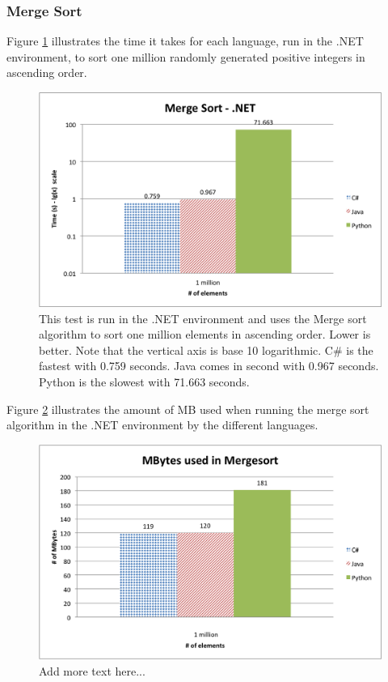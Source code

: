 \subsubsection{Merge Sort}

Figure \ref{fig:net_merge_sort} illustrates the time it takes for each language, run in the .NET environment, to sort one million randomly generated positive integers in ascending order.

\begin{figure}[h]
	\centering
	\includegraphics[width=1.0\linewidth]{chapters/new_media/MergeSortNet.png}
	\caption{This test is run in the .NET environment and uses the Merge sort algorithm to sort one million elements in ascending order. Lower is better. Note that the vertical axis is base 10 logarithmic. C\# is the fastest with 0.759 seconds. Java comes in second with 0.967 seconds. Python is the slowest with 71.663 seconds.}
	\label{fig:net_merge_sort}
\end{figure}

Figure \ref{fig:net_merge_sort_memory} illustrates the amount of MB used when running the merge sort algorithm in the .NET environment by the different languages.

\begin{figure}[h]
	\centering
	\includegraphics[width=1.0\linewidth]{chapters/new_media/MBytesMergesort.png}
	\caption{Add more text here...}
	\label{fig:net_merge_sort_memory}
\end{figure}
